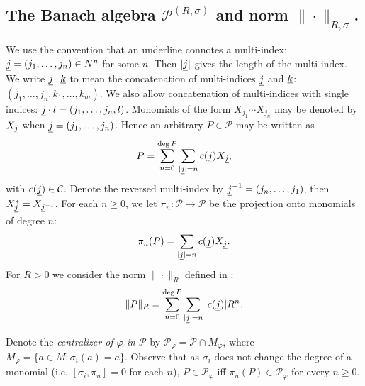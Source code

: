 \subsection{The Banach algebra $\mathscr{P}^{(R,\sigma)}$ and norm $\|\cdot\|_{R,\sigma}$.}\label{setup}

We use the convention that an underline connotes a multi-index: $\underline{j}=(j_1,\ldots, j_n) \in N^n$ for some $n$. Then $|\underline{j}|$ gives the length of the multi-index. We write $\underline{j}\cdot \underline{k}$  to mean the concatenation of multi-indices $\underline{j}$ and $\underline{k}$: $(j_1,\ldots,j_n,k_1,\ldots,k_m)$. We also allow concatenation of multi-indices with single indices: $\underline{j}\cdot l=(j_1,\ldots,j_n,l)$. Monomials of the form $X_{j_1}\cdots X_{j_n}$ may be denoted by $X_{\underline{j}}$ when $\underline{j}=(j_1,\ldots, j_n)$. Hence an arbitrary $P\in\mathscr{P}$ may be written as
	\begin{equation*}
		P=\sum_{n=0}^{\deg{P}} \sum_{|\underline{j}|=n} c(\underline{j}) X_{\underline{j}},
	\end{equation*}
with $c(\underline{j})\in\mathcal C$. Denote the reversed multi-index by $\underline{j}^{-1}=(j_n,\ldots, j_1)$, then $X_{\underline{j}}^*=X_{\underline{j}^{-1}}$. For each $n\geq 0$, we let $\pi_n\colon \mathscr{P}\rightarrow \mathscr{P}$ be the projection onto monomials of degree $n$:
	\begin{equation*}
		\pi_n(P)=\sum_{|\underline{j}|=n} c(\underline{j}) X_{\underline{j}}.
	\end{equation*}
For $R>0$ we consider the norm $\|\cdot \|_R$ defined in \cite{GS14}:
	\begin{align*}
		\|P\|_R= \sum_{n=0}^{\deg{P}} \sum_{|\underline{j}|=n} |c(\underline{j})| R^n.
	\end{align*}\par
	Denote the \textit{centralizer of $\varphi$ in $\mathscr{P}$} by $\mathscr{P}_{\varphi}=\mathscr{P}\cap M_\varphi$, where $M_\varphi=\{a\in M\colon \sigma_i(a)=a\}$. Observe that as $\sigma_i$ does not change the degree of a monomial (i.e. $[\sigma_i,\pi_n]=0$ for each $n$), $P\in\mathscr{P}_\varphi$ iff $\pi_n(P)\in\mathscr{P}_\varphi$ for every $n\geq 0$.\par
	

	
	
	
	
	
	
